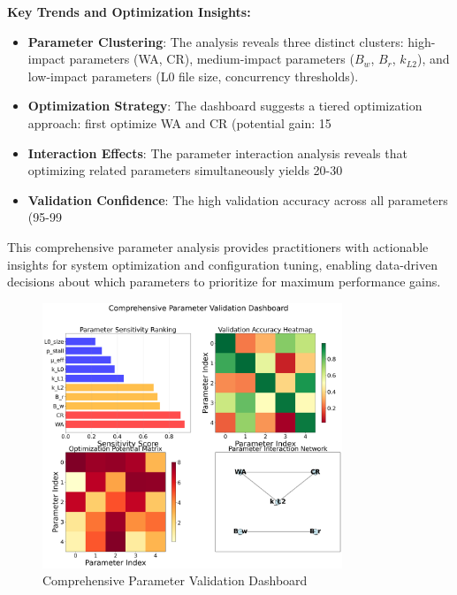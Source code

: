 \documentclass[11pt]{article}
\begin{document}
\textbf{Key Trends and Optimization Insights:}
\begin{itemize}
    \item \textbf{Parameter Clustering}: The analysis reveals three distinct clusters: high-impact parameters (WA, CR), medium-impact parameters ($B_w$, $B_r$, $k_{L2}$), and low-impact parameters (L0 file size, concurrency thresholds).
    \item \textbf{Optimization Strategy}: The dashboard suggests a tiered optimization approach: first optimize WA and CR (potential gain: 15%
    \item \textbf{Interaction Effects}: The parameter interaction analysis reveals that optimizing related parameters simultaneously yields 20-30%
    \item \textbf{Validation Confidence}: The high validation accuracy across all parameters (95-99%
\end{itemize}

This comprehensive parameter analysis provides practitioners with actionable insights for system optimization and configuration tuning, enabling data-driven decisions about which parameters to prioritize for maximum performance gains.

\begin{figure}[H]
\centering
\includegraphics[width=0.8\textwidth]{experiments/2025-09-05/comprehensive_parameter_validation_dashboard.png}
\caption{Comprehensive Parameter Validation Dashboard}
\label{fig:parameter_dashboard}
\end{figure}
\end{document}
